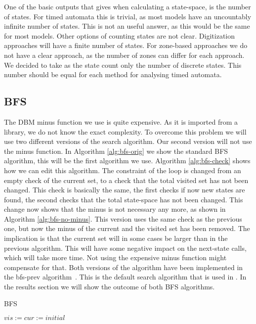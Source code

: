 One of the basic outputs that \ltsmin{} gives when calculating a state-space, is the number of states. For timed automata this is trivial, as most models have an uncountably infinite number of states. This is not an useful answer, as this would be the same for most models. Other options of counting states are not clear. Digitization approaches will have a finite number of states. For zone-based approaches we do not have a clear approach, as the number of zones can differ for each approach. We decided to take as the state count only the number of discrete states. This number should be equal for each method for analysing timed automata.

\subsection{BFS}
\label{subsection:bfs}
The DBM minus function we use is quite expensive. As it is imported from a library, we do not know the exact complexity. To overcome this problem we will use two different versions of the search algorithm. Our second version will not use the minus function. In Algorithm \ref{alg:bfs-orig} we show the standard BFS algorithm, this will be the first algorithm we use. Algorithm \ref{alg:bfs-check} shows how we can edit this algorithm. The constraint of the loop is changed from an empty check of the current set, to a check that the total visited set has not been changed. This check is basically the same, the first checks if now new states are found, the second checks that the total state-space has not been changed. This change now shows that the minus is not necessary any more, as shown in Algorithm \ref{alg:bfs-no-minus}. This version uses the same check as the previous one, but now the minus of the current and the visited set has been removed. The implication is that the current set will in some cases be larger than in the previous algorithm. This will have some negative impact on the next-state calls, which will take more time. Not using the expensive minus function might compensate for that. Both versions of the algorithm have been implemented in the bfs-prev algorithm~\cite{rwcmatrices}. This is the default search algorithm that is used in \ltsmin{}. In the results section we will show the outcome of both BFS algorithms. 

\begin{algorithm}
\caption{BFS}\label{alg:bfs-orig}
\begin{algorithmic}[1]
	\State $vis := cur := initial$
	\EndWhile
	
\EndProcedure	
\end{algorithmic}
\end{algorithm}

